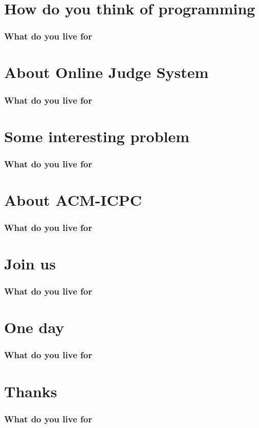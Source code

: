 \documentclass{beamer}
\begin{document}
\section{How do you think of programming}
\begin{frame}
\frametitle{What do you live for}

\end{frame}


\section{About Online Judge System}
\begin{frame}
\frametitle{What do you live for}

\end{frame}


\section{Some interesting problem}
\begin{frame}
\frametitle{What do you live for}

\end{frame}


\section{About ACM-ICPC}
\begin{frame}
\frametitle{What do you live for}

\end{frame}


\section{Join us}
\begin{frame}
\frametitle{What do you live for}

\end{frame}


\section{One day}
\begin{frame}
\frametitle{What do you live for}

\end{frame}


\section{Thanks}
\begin{frame}
\frametitle{What do you live for}

\end{frame}

  
 
\end{document}
